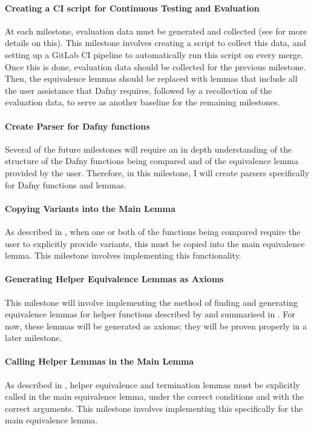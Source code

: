 \paragraph{Creating a CI script for Continuous Testing and Evaluation}\label{para:ci-scripts} At each milestone, evaluation data must be generated and collected (see  for more details on this). This milestone involves creating a script to collect this data, and setting up a GitLab CI pipeline to automatically run this script on every merge. Once this is done, evaluation data should be collected for the previous milestone. Then, the equivalence lemmas should be replaced with lemmas that include all the user assistance that Dafny requires, followed by a recollection of the evaluation data, to serve as another baseline for the remaining milestones. 

\paragraph{Create Parser for Dafny functions}\label{para:parser} Several of the future milestones will require an in depth understanding of the structure of the Dafny functions being compared and of the equivalence lemma provided by the user. Therefore, in this milestone, I will create parsers specifically for Dafny functions and lemmas. 

\paragraph{Copying Variants into the Main Lemma}\label{para:variants} As described in , when one or both of the functions being compared require the user to explicitly provide variants, this must be copied into the main equivalence lemma. This milestone involves implementing this functionality.

\paragraph{Generating Helper Equivalence Lemmas as Axioms}\label{para:helper-axioms} This milestone will involve implementing the method of finding and generating equivalence lemmas for helper functions described by \textcite{milovancevicProvingDisprovingEquivalence2023} and summarised in . For now, these lemmas will be generated as axioms; they will be proven properly in a later milestone. 

\paragraph{Calling Helper Lemmas in the Main Lemma}\label{para:calling-lemmas-main} As described in , helper equivalence and termination lemmas must be explicitly called in the main equivalence lemma, under the correct conditions and with the correct arguments. This milestone involves implementing this specifically for the main equivalence lemma.

